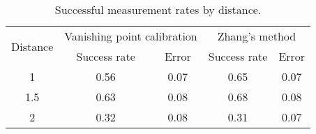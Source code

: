 \begin{table}
\centering
\begin{tabular}{@{} *5c @{}}
\toprule
\multirow{2}{*}{Distance} & \multicolumn{2}{c}{Vanishing point calibration} & \multicolumn{2}{c}{Zhang's method}\\ 
\cmidrule(r){2-3}
\cmidrule(r){4-5}
& Success rate & Error & Success rate & Error \\
\midrule
 1 		& 0.56 & 0.07 & 0.65 & 0.07 \\ 
 1.5  	& 0.63 & 0.08 & 0.68 & 0.08 \\
 2 		& 0.32 & 0.08 & 0.31 & 0.07 \\
\bottomrule
 \end{tabular}
 \caption{Successful measurement rates by distance.}
\label{table:measurement_by_distance}
\end{table}
